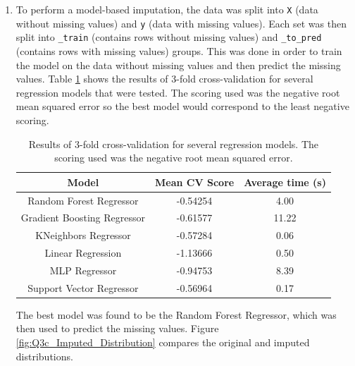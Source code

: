\documentclass{article}
\begin{document}
\begin{enumerate}[label=\alph*)]
    \item To perform a model-based imputation, the data was split into \verb|X| (data without missing values) and \verb|y| (data with missing values). Each set was then split into \verb|_train| (contains rows without missing values) and \verb|_to_pred| (contains rows with missing values) groups. This was done in order to train the model on the data without missing values and then predict the missing values. Table \ref{tab:Q3c_CV} shows the results of 3-fold cross-validation for several regression models that were tested. The scoring used was the negative root mean squared error so the best model would correspond to the least negative scoring.
    \begin{table}[!htb]
        \centering
        \begin{tabular}{|c|c|c|}\hline
            \textbf{Model} & \textbf{Mean CV Score} & \textbf{Average time (s)} \\ \hline
            Random Forest Regressor & -0.54254 & 4.00 \\ \hline
            Gradient Boosting Regressor & -0.61577 & 11.22 \\ \hline
            KNeighbors Regressor & -0.57284 & 0.06 \\ \hline
            Linear Regression & -1.13666 & 0.50 \\ \hline
            MLP Regressor & -0.94753 & 8.39 \\ \hline
            Support Vector Regressor & -0.56964 & 0.17 \\ \hline
        \end{tabular}
        \caption{Results of 3-fold cross-validation for several regression models. The scoring used was the negative root mean squared error.}
        \label{tab:Q3c_CV}
    \end{table}
    The best model was found to be the Random Forest Regressor, which was then used to predict the missing values. Figure \ref{fig:Q3c_Imputed_Distribution} compares the original and imputed distributions.
    \begin{figure}[!htb]
        \centering

\end{figure}
\end{enumerate}
\end{document}

